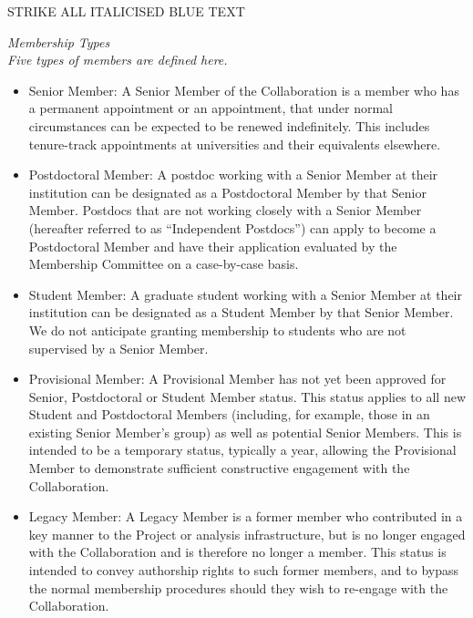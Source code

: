 \documentclass[12pt]{article}
\begin{document}
{\color{blue}

\noindent STRIKE ALL ITALICISED BLUE TEXT \\

{\it
{\large {} Membership Types}\\

Five types of members are defined here.  
\begin{itemize}

\item {Senior Member:} A Senior Member of the Collaboration is a member who has a permanent appointment or an appointment, that under normal circumstances can be expected to be renewed indefinitely.   This includes tenure-track appointments at universities and their equivalents elsewhere.  

\item {Postdoctoral Member:} A postdoc working with a Senior Member at their institution can be designated as a Postdoctoral Member by that Senior Member. Postdocs that are not working closely with a Senior Member (hereafter referred to as ``Independent Postdocs'') can apply to become a Postdoctoral Member and have their application evaluated by the Membership Committee on a case-by-case basis.

\item {Student Member:} A graduate student working with a Senior Member at their institution can be designated as a Student Member by that Senior Member.  We do not anticipate granting membership to students who are not supervised by a Senior Member.


\item {Provisional Member:}  A Provisional Member has not yet been approved for Senior, Postdoctoral or Student Member status.  This status applies to all new Student and Postdoctoral Members (including, for example, those in an existing Senior Member's group) as well as potential Senior Members.  This is intended to be a temporary status, typically a year, allowing the Provisional Member to demonstrate sufficient constructive engagement with the Collaboration.

\item {Legacy Member:}  A Legacy Member is a former member who contributed in a key manner to the Project or analysis infrastructure, but is no longer engaged with the Collaboration and is therefore no longer a member.  This status is intended to convey authorship rights to such former members, and to bypass the normal membership procedures should they wish to re-engage with the Collaboration.


\end{itemize}}}
\end{document}
